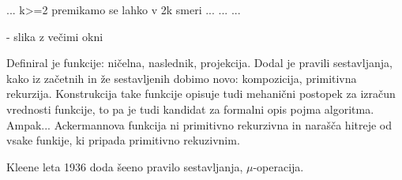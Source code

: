 \documentclass[10pt,a4paper,oneside]{book}
\begin{document}
%

... k>=2
premikamo se lahko v 2k smeri
...
...
...

\fixme - slika z večimi okni




Definiral je funkcije: ničelna, naslednik, projekcija.
Dodal je pravili sestavljanja, kako iz začetnih in že sestavljenih dobimo novo: kompozicija, primitivna rekurzija. %
Konstrukcija take funkcije opisuje tudi mehanični postopek za izračun vrednosti funkcije, to pa je tudi kandidat za formalni opis pojma algoritma.
\br
Ampak... Ackermannova funkcija ni primitivno rekurzivna in narašča hitreje od vsake funkije, ki pripada primitivno rekuzivnim.

Kleene leta 1936 doda šeeno pravilo sestavljanja, $\mu$-operacija. %
\end{document}
